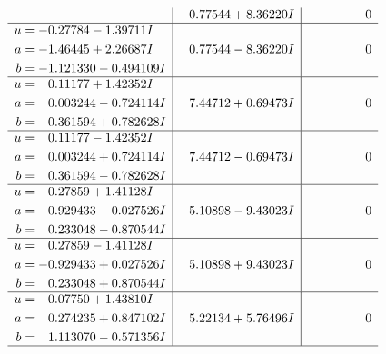 \documentclass[1p]{elsarticle_modified}
\theoremstyle{definition}
\begin{document}
$$\begin{array}{c|c|c}
 & \phantom{-}0.77544 + 8.36220 I & \phantom{-0.000000 } 0 \\ \hline\begin{aligned}
u &= -0.27784 - 1.39711 I \\
a &= -1.46445 + 2.26687 I \\
b &= -1.121330 - 0.494109 I\end{aligned}
 & \phantom{-}0.77544 - 8.36220 I & \phantom{-0.000000 } 0 \\ \hline\begin{aligned}
u &= \phantom{-}0.11177 + 1.42352 I \\
a &= \phantom{-}0.003244 - 0.724114 I \\
b &= \phantom{-}0.361594 + 0.782628 I\end{aligned}
 & \phantom{-}7.44712 + 0.69473 I & \phantom{-0.000000 } 0 \\ \hline\begin{aligned}
u &= \phantom{-}0.11177 - 1.42352 I \\
a &= \phantom{-}0.003244 + 0.724114 I \\
b &= \phantom{-}0.361594 - 0.782628 I\end{aligned}
 & \phantom{-}7.44712 - 0.69473 I & \phantom{-0.000000 } 0 \\ \hline\begin{aligned}
u &= \phantom{-}0.27859 + 1.41128 I \\
a &= -0.929433 - 0.027526 I \\
b &= \phantom{-}0.233048 - 0.870544 I\end{aligned}
 & \phantom{-}5.10898 - 9.43023 I & \phantom{-0.000000 } 0 \\ \hline\begin{aligned}
u &= \phantom{-}0.27859 - 1.41128 I \\
a &= -0.929433 + 0.027526 I \\
b &= \phantom{-}0.233048 + 0.870544 I\end{aligned}
 & \phantom{-}5.10898 + 9.43023 I & \phantom{-0.000000 } 0 \\ \hline\begin{aligned}
u &= \phantom{-}0.07750 + 1.43810 I \\
a &= \phantom{-}0.274235 + 0.847102 I \\
b &= \phantom{-}1.113070 - 0.571356 I\end{aligned}
 & \phantom{-}5.22134 + 5.76496 I & \phantom{-0.000000 } 0\\
 \hline 
 \end{array}$$\newpage$$\begin{array}{c|c|c}  

\end{array}$$
\end{document}
